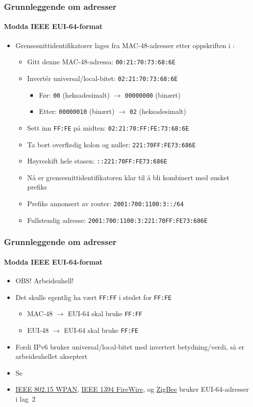 \begin{frame}%
  \frametitle{Grunnleggende om adresser}
  \framesubtitle{Modda IEEE EUI-64-format}
  \begin{itemize}[<+->]
  \item Grensesnittidentifikatorer lages fra MAC-48-adresser etter
    oppskriften i :
    \begin{itemize}[<+->]
    \item Gitt denne MAC-48-adressa: \texttt{00:21:70:73:68:6E}
    \item Invertér universal/local-bitet: \texttt{0\alert{2}:21:70:73:68:6E}
      \begin{itemize}[<+->]
      \item Før: \texttt{0\alert{0}} (heksadesimalt) $\to$ \texttt{000000\alert{0}0} (binært)
      \item Etter: \texttt{000000\alert{1}0} (binært) $\to$ \texttt{0\alert{2}} (heksadesimalt)
      \end{itemize}
    \item Sett inn \texttt{FF:FE} på midten: \texttt{02:21:70:\alert{FF:FE}:73:68:6E}
    \item Ta bort overflødig kolon og nuller: \texttt{221:70FF:FE73:686E}
    \item Høyreskift hele stasen: \texttt{::221:70FF:FE73:686E}
    \item Nå er grensesnittidentifikatoren klar til å bli kombinert med ønsket prefiks
    \item Prefiks annonsert av router: \texttt{2001:700:1100:3::/64}
    \item Fullstendig adresse: \texttt{2001:700:1100:3:221:70FF:FE73:686E}
    \end{itemize}
  \end{itemize}
\end{frame}

\begin{frame}%
  \frametitle{Grunnleggende om adresser}
  \framesubtitle{Modda IEEE EUI-64-format}
  \begin{itemize}[<+->]
  \item OBS! Arbeidsuhell!
  \item Det skulle egentlig ha vært \texttt{FF:FF} i stedet for
    \texttt{FF:FE}
    \begin{itemize}
    \item MAC-48 $\to$ EUI-64 skal bruke \texttt{FF:FF}
    \item EUI-48 $\to$ EUI-64 skal bruke \texttt{FF:FE}
    \end{itemize}
  \item Fordi IPv6 bruker universal/local-bitet med invertert
    betydning/verdi, så er arbeidsuhellet akseptert
  \item Se 
  \item \href{http://en.wikipedia.org/wiki/IEEE_802.15}{IEEE 802.15
      WPAN}, \href{http://en.wikipedia.org/wiki/IEEE_1394}{IEEE 1394
      FireWire}, og \href{http://en.wikipedia.org/wiki/ZigBee}{ZigBee}
    bruker EUI-64-adresser i lag~2
  \end{itemize}
\end{frame}

